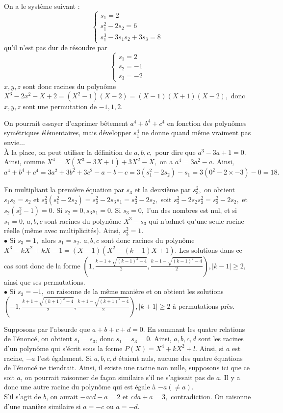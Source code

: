 \begin{sol}On a le système suivant :
\[\begin{cases}
s_1=2\\
s_1^2-2s_2=6\\
s_1^3-3s_1s_2+3s_3=8
\end{cases}\]qu'il n'est pas dur de résoudre par 
$$\begin{cases}
s_1=2\\
s_2=-1\\
s_3=-2
\end{cases}$$
$x,y,z$ sont donc racines du polynôme $X^3-2x^2-X+2=(X^2-1)(X-2)=(X-1)(X+1)(X-2),$ donc $x,y,z$ sont une permutation de $-1,1,2$.
\end{sol}
\begin{sol}
On pourrait essayer d'exprimer bêtement $a^4+b^4+c^4$ en fonction des polynômes symétriques élémentaires, mais développer $s_1^4$ ne donne quand même vraiment pas envie...\\À la place, on peut utiliser la définition de $a,b,c,$ pour dire que $a^3-3a+1=0.$ Ainsi, comme $X^4=X(X^3-3X+1)+3X^2-X,$ on a $a^4=3a^2-a.$ Ainsi, $a^4+b^4+c^4=3a^2+3b^2+3c^2-a-b-c=3(s_1^2-2s_2)-s_1=3(0^2-2\times -3)-0=18.$
\end{sol}
\begin{sol}
En multipliant la première équation par $s_3$ et la deuxième par $s_3^2,$ on obtient $s_1s_3=s_2$ et $s_3^2(s_1^2-2s_2)=s_2^2-2s_3s_1=s_2^2-2s_2,$ soit $s_2^2-2s_2s_3^2=s_2^2-2s_2,$ et $s_2(s_3^2-1)=0.$ Si $s_2=0,s_3s_1=0.$ Si $s_3=0,$ l'un des nombres est nul, et si $s_1=0$, $a,b,c$ sont racines du polynôme $X^3-s_3$ qui n'admet qu'une seule racine réelle (même avec multiplicités). Ainsi, $s_3^2=1.$\\$\bullet$ Si $s_3=1,$ alors $s_1=s_2.$ $a,b,c$ sont donc racines du polynôme $X^3-kX^2+kX-1=(X-1)(X^2-(k-1)X+1).$ Les solutions dans ce cas sont donc de la forme $(1,\frac{k-1+\sqrt{(k-1)^2-4}}2,\frac{k-1-\sqrt{(k-1)^2-4}}2),|k-1|\geqslant 2,$ ainsi que ses permutations.\\
$\bullet$ Si $s_3=-1,$ on raisonne de la même manière et on obtient les solutions $(-1,\frac{k+1+\sqrt{(k+1)^2-4}}2,\frac{k+1-\sqrt{(k+1)^2-4}}2) ,|k+1|\geqslant 2$ à permutations près.
\end{sol}
\begin{sol}
Supposons par l'absurde que $a+b+c+d=0.$ En sommant les quatre relations de l'énoncé, on obtient $s_1=s_3$, donc $s_1=s_3=0.$ Ainsi, $a,b,c,d$ sont les racines d'un polynôme qui s'écrit sous la forme $P(X)=X^4+kX^2+l$. Ainsi, si $a$ est racine, $-a$ l'est également. Si $a,b,c,d$ étaient nuls, aucune des quatre équations de l'énoncé ne tiendrait. Ainsi, il existe une racine non nulle, supposons ici que ce soit $a$, on pourrait raisonner de façon similaire s'il ne s'agissait pas de $a$. Il y a donc une autre racine du polynôme qui est égale à $-a(\ne a)$.\\
S'il s'agit de $b$, on aurait $-acd-a=2$ et $cda+a=3,$ contradiction. On raisonne d'une manière similaire si $a=-c$ ou $a=-d.$
\end{sol}
